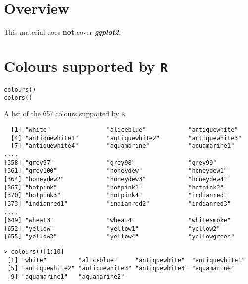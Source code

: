 
\section{Overview}
This material does \textbf{not} cover \textbf{\textit{ggplot2}}.
\section{Colours supported by \texttt{R}}

\begin{verbatim}
colours()
colors()
\end{verbatim}

A list of the 657 colours supported by \texttt{R}.
\begin{verbatim}
  [1] "white"                "aliceblue"            "antiquewhite"        
  [4] "antiquewhite1"        "antiquewhite2"        "antiquewhite3"       
  [7] "antiquewhite4"        "aquamarine"           "aquamarine1"    
....
[358] "grey97"               "grey98"               "grey99"              
[361] "grey100"              "honeydew"             "honeydew1"           
[364] "honeydew2"            "honeydew3"            "honeydew4"           
[367] "hotpink"              "hotpink1"             "hotpink2"            
[370] "hotpink3"             "hotpink4"             "indianred"           
[373] "indianred1"           "indianred2"           "indianred3"                   
....
[649] "wheat3"               "wheat4"               "whitesmoke"          
[652] "yellow"               "yellow1"              "yellow2"             
[655] "yellow3"              "yellow4"              "yellowgreen"     
\end{verbatim}

\begin{verbatim}
> colours()[1:10]
 [1] "white"         "aliceblue"     "antiquewhite"  "antiquewhite1"
 [5] "antiquewhite2" "antiquewhite3" "antiquewhite4" "aquamarine"   
 [9] "aquamarine1"   "aquamarine2"
\end{verbatim}
